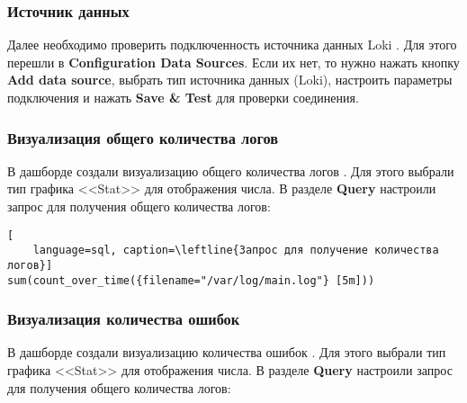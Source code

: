 \begin{image}
    \caption{Dashboards с тремя визуализациями}
    \label{fig:dashboard}
\end{image}

\subsubsection{Источник данных}

Далее необходимо проверить подключенность источника данных Loki
.
Для этого перешли в \textbf{Configuration \rarrow Data Sources}.
Если их нет, то нужно нажать кнопку \textbf{Add data source},
выбрать тип источника данных (Loki), настроить параметры подключения
и нажать \textbf{Save \& Test} для проверки соединения.

\begin{image}
    \caption{Источник данных Loki}
    \label{fig:datasource}
\end{image}

\subsubsection{Визуализация общего количества логов}

В дашборде создали визуализацию общего количества логов .
Для этого выбрали тип графика <<Stat>> для отображения числа.
В разделе \textbf{Query} настроили запрос
для получения общего количества логов:

\begin{lstlisting}[
	language=sql, caption=\leftline{Запрос для получение количества логов}]
sum(count_over_time({filename="/var/log/main.log"} [5m]))
\end{lstlisting}

\begin{image}
    \caption{Создание визуализации общего количества логов}
    \label{fig:vis:total}
\end{image}

\subsubsection{Визуализация количества ошибок}

В дашборде создали визуализацию количества ошибок .
Для этого выбрали тип графика <<Stat>> для отображения числа.
В разделе \textbf{Query} настроили запрос
для получения общего количества логов:

